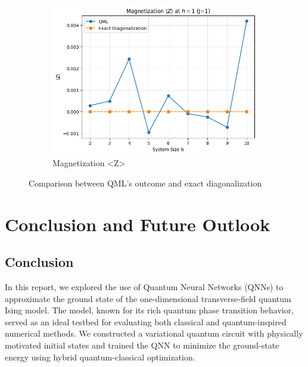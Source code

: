 \documentclass[pre,twocolumn,floatfix]{revtex4-1}
\begin{document}
\begin{figure}[htbp]
\begin{subfigure}[b]{0.32\textwidth}
        \label{(b)}
    \end{subfigure}
    \hfill %
    \begin{subfigure}[b]{0.32\textwidth}
        \centering
        \includegraphics[width=\linewidth]{images/cmp_Z.png} %
        \caption{Magnetization <Z>}
        \label{(c)}
    \end{subfigure}
    
    \caption{Comparison between QML's outcome and exact diagonalization}
    \label{fig:three_images_together}
\end{figure}

\section{Conclusion and Future Outlook}
\subsection{Conclusion}
In this report, we explored the use of Quantum Neural Networks (QNNs) to approximate the ground state of the one-dimensional transverse-field quantum Ising model. The model, known for its rich quantum phase transition behavior, served as an ideal testbed for evaluating both classical and quantum-inspired numerical methods. We constructed a variational quantum circuit with physically motivated initial states and trained the QNN to minimize the ground-state energy using hybrid quantum-classical optimization.
\end{document}
